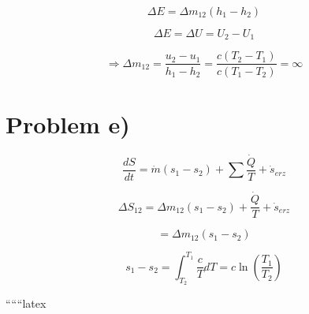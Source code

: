\begin{equation*}
\Delta E = \Delta m_{12} (h_1 - h_2)
\end{equation*}

\begin{equation*}
\Delta E = \Delta U = U_2 - U_1
\end{equation*}

\begin{equation*}
\Rightarrow \Delta m_{12} = \frac{u_2 - u_1}{h_1 - h_2} = \frac{c(T_2 - T_1)}{c(T_1 - T_2)} = \infty
\end{equation*}

\section*{Problem e)}

\begin{equation*}
\frac{dS}{dt} = \dot{m}(s_1 - s_2) + \sum \frac{\dot{Q}}{T} + \dot{s}_{erz}
\end{equation*}

\begin{equation*}
\Delta S_{12} = \Delta m_{12} (s_1 - s_2) + \frac{\dot{Q}}{T} + \dot{s}_{erz}
\end{equation*}

\begin{equation*}
= \Delta m_{12} (s_1 - s_2)
\end{equation*}

\begin{equation*}
s_1 - s_2 = \int_{T_2}^{T_1} \frac{c}{T} dT = c \ln \left( \frac{T_1}{T_2} \right)
\end{equation*}

``````latex


